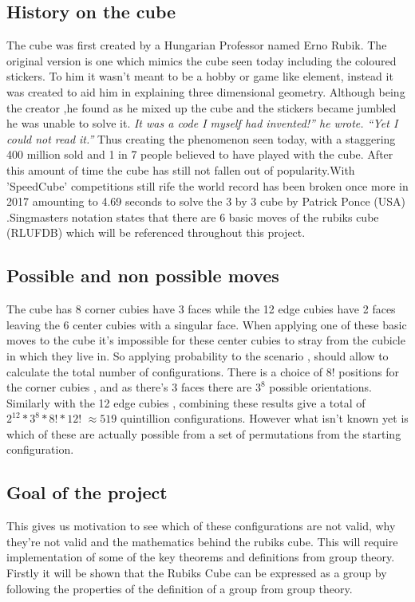 \documentclass{article}
\begin{document}
\subsection{History on the cube}
\cite{History}
The cube was first created by a Hungarian Professor named Erno Rubik. The original version is one which mimics the cube seen today including the coloured stickers. To him it wasn't meant to be a hobby or game like element, instead it was created to aid him in explaining three dimensional geometry. Although being the creator ,he found as he mixed up the cube and the stickers became jumbled he was unable to solve it.
\textit{It was a code I myself had invented!” he wrote. “Yet I could not read it.”}
Thus creating the phenomenon seen today, with a staggering 400 million sold and  1 in 7 people believed to have played with the cube. After this amount of time the cube has still not fallen out of popularity.With 'SpeedCube' competitions still rife the world record has been broken once more in 2017 amounting to 4.69 seconds to solve the 3 by 3 cube by Patrick Ponce (USA) \cite{Record}.\newline Singmasters \cite{Magic} notation states that there are 6 basic moves of the rubiks cube (RLUFDB) which will be referenced throughout this project.
\subsection{Possible and non possible moves}

The cube has 8 corner cubies have 3 faces while the 12 edge cubies have 2 faces leaving the 6 center cubies with a singular face. When applying one of these basic moves to the cube it's impossible for these center cubies to stray from the cubicle in which they live in.
So applying probability to the scenario , should allow to calculate the total number of configurations.
There is a choice of 8! positions for the corner cubies , and as there's 3 faces there are $3^8$ possible orientations. Similarly with the 12 edge cubies , combining these results give a total of $2^{12} * 3^8 * 8! * 12!$ $\approx 519$ quintillion configurations.
However what isn't known yet is which of these are actually possible from a set of permutations from the starting configuration.

\subsection{Goal of the project}

This gives us motivation to see which of these configurations are not valid, why they're not valid and the mathematics behind the rubiks cube. This will require implementation of some of the key theorems and definitions from group theory. Firstly it will be shown that the Rubiks Cube can be expressed as a group by following the properties of the definition of a group from group theory.
\end{document}

